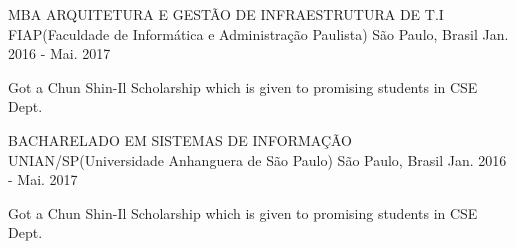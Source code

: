 

\begin{cventries}

  \cventry
    {MBA ARQUITETURA E GESTÃO DE INFRAESTRUTURA DE T.I} %
    {FIAP(Faculdade de Informática e Administração Paulista)} %
    {São Paulo, Brasil} %
    {Jan. 2016 - Mai. 2017} %
    {
      \begin{cvitems} %
        \item {Got a Chun Shin-Il Scholarship which is given to promising students in CSE Dept.}
      \end{cvitems}
    }

    {BACHARELADO EM SISTEMAS DE INFORMAÇÃO} %
    {UNIAN/SP(Universidade Anhanguera de São Paulo)} %
    {São Paulo, Brasil} %
    {Jan. 2016 - Mai. 2017} %
    {
      \begin{cvitems} %
        \item {Got a Chun Shin-Il Scholarship which is given to promising students in CSE Dept.}
      \end{cvitems}
    }

\end{cventries}
